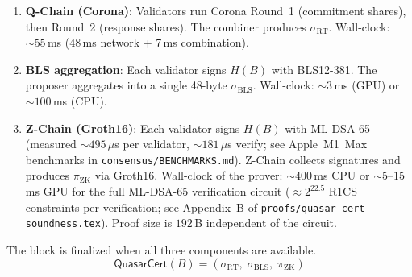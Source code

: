 \begin{enumerate}[nosep]
  \item \textbf{Q-Chain (Corona)}: Validators run Corona Round~1
    (commitment shares), then Round~2 (response shares).  The combiner
    produces $\sigma_{\mathrm{RT}}$.  Wall-clock: ${\sim}55$\,ms
    (48\,ms network + 7\,ms combination).
  \item \textbf{BLS aggregation}: Each validator signs $H(B)$ with
    BLS12-381.  The proposer aggregates into a single 48-byte
    $\sigma_{\mathrm{BLS}}$.  Wall-clock: ${\sim}3$\,ms (GPU) or
    ${\sim}100$\,ms (CPU).
  \item \textbf{Z-Chain (Groth16)}: Each validator signs $H(B)$ with
    ML-DSA-65 (measured ${\sim}495$\,$\mu$s per validator, ${\sim}181$\,$\mu$s
    verify; see Apple~M1~Max benchmarks in \texttt{consensus/BENCHMARKS.md}).
    Z-Chain collects signatures and produces $\pi_{\mathrm{ZK}}$ via Groth16.
    Wall-clock of the prover: ${\sim}400$\,ms CPU or ${\sim}5$--$15$\,ms GPU
    for the full ML-DSA-65 verification circuit ($\approx 2^{22.5}$ R1CS
    constraints per verification; see Appendix~B of
    \texttt{proofs/quasar-cert-soundness.tex}). Proof size is $192$\,B
    independent of the circuit.
\end{enumerate}

The block is finalized when all three components are available.
\[
  \mathsf{QuasarCert}(B) =
  (\sigma_{\mathrm{RT}},\; \sigma_{\mathrm{BLS}},\; \pi_{\mathrm{ZK}})
\]

